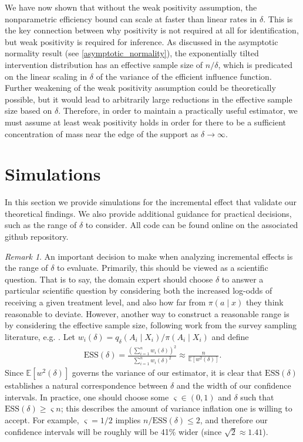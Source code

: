\documentclass[11pt,twoside]{article}
\theoremstyle{definition}
\theoremstyle{remark}
\newtheorem{remark}{Remark}
\begin{document}
We have now shown that without the weak positivity assumption, the nonparametric efficiency bound can scale at faster than linear rates in $\delta$. This is the key connection between why positivity is not required at all for identification, but weak positivity is required for inference. As discussed in the asymptotic normality result (see \cref{asymptotic_normality}), the exponentially tilted intervention distribution has an effective sample size of $n / \delta$, which is predicated on the linear scaling in $\delta$ of the variance of the efficient influence function. Further weakening of the weak positivity assumption could be theoretically possible, but it would lead to arbitrarily large reductions in the effective sample size based on $\delta$. Therefore, in order to maintain a practically useful estimator, we must assume at least weak positivity holds in order for there to be a sufficient concentration of mass near the edge of the support as $\delta \to \infty$.

\section{Simulations} \label{simulation_section}

In this section we provide simulations for the incremental effect that validate our theoretical findings. We also provide additional guidance for practical decisions, such as the range of $\delta$ to consider. All code can be found online on the associated github repository.


\begin{remark}
    An important decision to make when analyzing incremental effects is the range of $\delta$ to evaluate. Primarily, this should be viewed as a scientific question. That is to say, the domain expert should choose $\delta$ to answer a particular scientific question by considering both the increased log-odds of receiving a given treatment level, and also how far from $\pi(a \mid x)$ they think reasonable to deviate.  However, another way to construct a reasonable range is by considering the effective sample size, following work from the survey sampling literature, e.g. \cite{kish_65}. Let $w_i(\delta) = q_\delta(A_i \mid X_i) / \pi(A_i \mid X_i)$ and define
    \begin{align*}
        \text{ESS}(\delta) = \frac{\left( \sum^n_{i=1} w_i(\delta) \right)^2}{\sum^n_{i=1} w_i(\delta)^2} \approx \frac{n}{\mathbb{E}[w^2(\delta)]}.
    \end{align*}
    Since $\mathbb{E}[w^2(\delta)]$ governs the variance of our estimator, it is clear that $\text{ESS}(\delta)$ establishes a natural correspondence between $\delta$ and the width of our confidence intervals. In practice, one should choose some $\varsigma \in (0, 1)$ and $\delta$ such that $\text{ESS}(\delta) \geq \varsigma n$; this describes the amount of variance inflation one is willing to accept. For example, $\varsigma = 1/2$ implies $n / \text{ESS}(\delta) \leq 2$, and therefore our confidence intervals will be roughly will be 41\% wider (since $\sqrt{2} \approx 1.41$). 
\end{remark}
\end{document}
